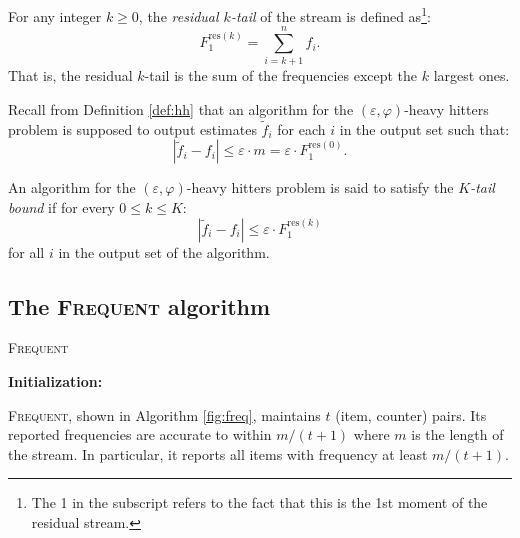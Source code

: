 \documentclass[sigconf,review=true,anonymous=true,screen]{acmart}
\newcommand{\eps}{\varepsilon}
\begin{document}
For any integer $k \geq 0$, the {\em residual $k$-tail} of the stream is defined as\footnote{The 1 in the subscript refers to the fact that this is the 1st moment of the residual stream.}:
$$F_1^{\text{res}(k)} = \sum_{i=k+1}^n f_i.$$
That is, the residual $k$-tail is the sum of the frequencies except the $k$ largest ones. 

Recall from Definition \ref{def:hh} that an algorithm for the $(\eps, \varphi)$-heavy hitters problem is supposed to output estimates $\tilde{f}_i$ for each $i$ in the output set such that:
$$|\tilde{f}_i - f_i| \leq \eps \cdot m = \eps\cdot F_1^{\text{res}(0)}.$$
\begin{definition}\label{def:tailbd}
An algorithm for the $(\eps,\varphi)$-heavy hitters problem is said to satisfy the {\em $K$-tail bound} if for every $0\leq k\leq K$:
$$|\tilde{f}_i - f_i| \leq \eps \cdot F_1^{\text{res}(k)}$$
for all $i$ in the output set of the algorithm.
\end{definition}


\subsection{The \textsc{Frequent} algorithm}   
    \begin{algorithm}
    	\caption{\textsc{Frequent}}
	\label{fig:freq}
    	\SetAlgoLined
	

	\textbf{Initialization:}

    \end{algorithm}

    \vspace*{.5cm}
\textsc{Frequent}, shown in Algorithm \ref{fig:freq}, maintains $t$ (item, counter) pairs. Its reported frequencies are accurate to within $m/(t+1)$ where $m$ is the length of the stream. In particular, it reports all items with frequency at least $m/(t+1)$. 
\end{document}
